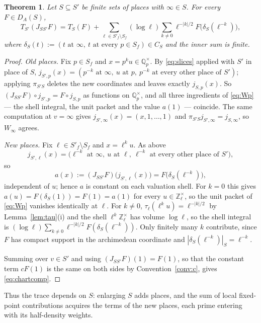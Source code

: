 \documentclass[11pt]{amsart}
\newtheorem{theorem}{Theorem}[section]
\theoremstyle{definition}
\theoremstyle{remark}
\newcommand{\Z}{\mathbb Z}
\newcommand{\Q}{\mathbb Q}
\newcommand{\DA}{D_A}
\begin{document}
\begin{theorem}\label{thm:chartcomp}
Let $S\subseteq S'$ be finite sets of places with $\infty\in S$.  For every
$F\in\DA(S)$,
\begin{equation}\label{eq:chartcomp}
T_{S'}(J_{SS'}F)=T_S(F)+\sum_{\ell\in S'_f\setminus S_f}(\log\ell)
\sum_{k\ne0}\ell^{-|k|/2}F\bigl(\delta_S(\ell^{-k})\bigr),
\end{equation}
where $\delta_S(t):=(t\text{ at }\infty,\ t\text{ at every }p\in S_f)\in C_S$
and the inner sum is finite.
\end{theorem}

\begin{proof}
\emph{Old places.}  Fix $p\in S_f$ and $x=p^{k}u\in\Q_p^{\times}$.  By
\eqref{eq:slices} applied with $S'$ in place of $S$,
$j_{S',p}(x)=(p^{-k}\text{ at }\infty,\ u\text{ at }p,\ p^{-k}\text{ at every
other place of }S')$; applying $\pi_{S'S}$ deletes the new coordinates and leaves
exactly $j_{S,p}(x)$.  So $(J_{SS'}F)\circ j_{S',p}=F\circ j_{S,p}$ as functions
on $\Q_p^{\times}$, and all three ingredients of \eqref{eq:Wp} --- the shell
integral, the unit packet and the value $a(1)$ --- coincide.  The same
computation at $v=\infty$ gives $j_{S',\infty}(x)=(x,1,\dots,1)$ and
$\pi_{S'S}j_{S',\infty}=j_{S,\infty}$, so $W_{\infty}$ agrees.

\emph{New places.}  Fix $\ell\in S'_f\setminus S_f$ and $x=\ell^{k}u$.  As above
\[
j_{S',\ell}(x)=\bigl(\ell^{-k}\text{ at }\infty,\ u\text{ at }\ell,\
\ell^{-k}\text{ at every other place of }S'\bigr),
\]
so
\[
a(x):=(J_{SS'}F)\bigl(j_{S',\ell}(x)\bigr)=F\bigl(\delta_S(\ell^{-k})\bigr),
\]
independent of $u$; hence $a$ is constant on each valuation shell.  For $k=0$
this gives $a(u)=F(\delta_S(1))=F(1)=a(1)$ for every $u\in\Z_{\ell}^{\times}$,
so the unit packet of \eqref{eq:Wp} vanishes identically at $\ell$.  For
$k\ne0$, $\tau_{\ell}(\ell^{k}u)=\ell^{-|k|/2}$ by Lemma~\ref{lem:tau}(i) and
the shell $\ell^{k}\Z_{\ell}^{\times}$ has volume $\log\ell$, so the shell
integral is $(\log\ell)\sum_{k\ne0}\ell^{-|k|/2}F(\delta_S(\ell^{-k}))$.  Only
finitely many $k$ contribute, since $F$ has compact support in the archimedean
coordinate and $|\delta_S(\ell^{-k})|_S=\ell^{-k}$.

Summing over $v\in S'$ and using $(J_{SS'}F)(1)=F(1)$, so that the constant term
$cF(1)$ is the same on both sides by Convention~\ref{conv:c}, gives
\eqref{eq:chartcomp}.
\end{proof}

Thus the trace depends on $S$: enlarging $S$ adds places, and the sum of local
fixed-point contributions acquires the terms of the new places, each prime
entering with its half-density weights.
\end{document}
